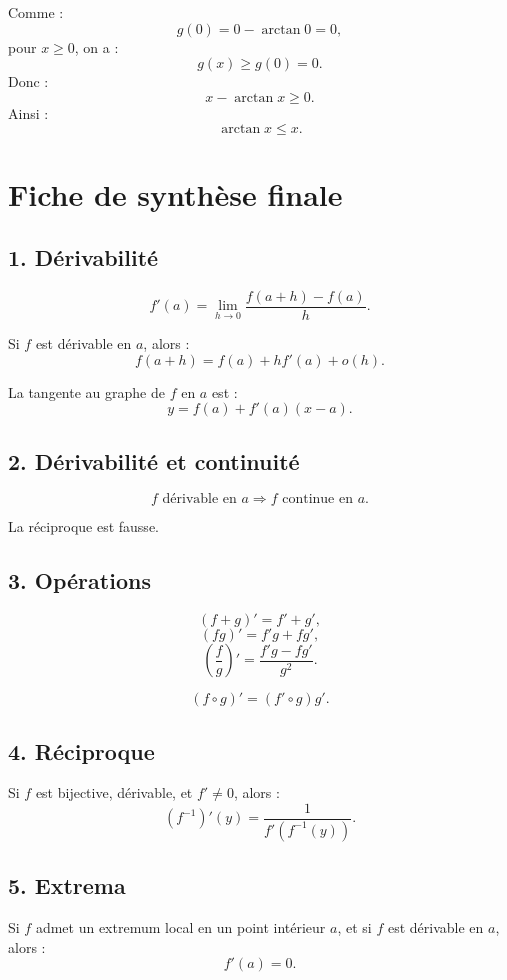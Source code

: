 \documentclass[11pt,a4paper]{article}
\newcommand{\implique}{\Longrightarrow}
\begin{document}
Comme :
\[
g(0)=0-\arctan0=0,
\]
pour \(x\geq0\), on a :
\[
g(x)\geq g(0)=0.
\]
Donc :
\[
x-\arctan x\geq0.
\]
Ainsi :
\[
\arctan x\leq x.
\]

\newpage
\section{Fiche de synthèse finale}

\subsection*{1. Dérivabilité}

\[
f'(a)=\lim_{h\to0}\frac{f(a+h)-f(a)}{h}.
\]

Si \(f\) est dérivable en \(a\), alors :
\[
f(a+h)=f(a)+hf'(a)+o(h).
\]

La tangente au graphe de \(f\) en \(a\) est :
\[
y=f(a)+f'(a)(x-a).
\]

\subsection*{2. Dérivabilité et continuité}

\[
f\text{ dérivable en }a
\implique
f\text{ continue en }a.
\]

La réciproque est fausse.

\subsection*{3. Opérations}

\[
(f+g)'=f'+g',
\]
\[
(fg)'=f'g+fg',
\]
\[
\left(\frac fg\right)'=\frac{f'g-fg'}{g^2}.
\]

\[
(f\circ g)'=(f'\circ g)g'.
\]

\subsection*{4. Réciproque}

Si \(f\) est bijective, dérivable, et \(f'\neq0\), alors :
\[
(f^{-1})'(y)=\frac1{f'(f^{-1}(y))}.
\]

\subsection*{5. Extrema}

Si \(f\) admet un extremum local en un point intérieur \(a\), et si \(f\) est dérivable en \(a\), alors :
\[
f'(a)=0.
\]
\end{document}
